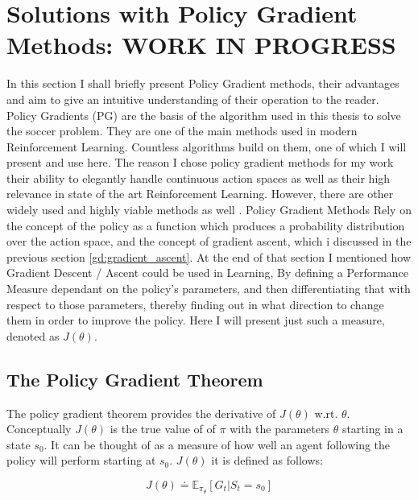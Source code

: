 \newpage
\section{Solutions with Policy Gradient Methods: WORK IN PROGRESS}\label{sec:policy_gradient}
\noindent
In this section I shall briefly present Policy Gradient methods, their advantages and aim to give an intuitive understanding of their operation to the reader. Policy Gradients (PG) are the basis of the algorithm used in this thesis to solve the soccer problem. They are one of the main methods used in modern Reinforcement Learning. Countless algorithms build on them, one of which I will present and use here. The reason I chose policy gradient methods for my work their ability to elegantly handle continuous action spaces as well as their high relevance in state of the art Reinforcement Learning. However, there are other widely used and highly viable methods as well \cite{arulkumaran_brief_2017}. Policy Gradient Methods Rely on the concept of the policy as a function which produces a probability distribution over the action space, and the concept of gradient ascent, which i discussed in the previous section \ref{gd:gradient_ascent}. At the end of that section I mentioned how Gradient Descent / Ascent could be used in Learning, By defining a Performance Measure dependant on the policy's parameters, and then differentiating that with respect to those parameters, thereby finding out in what direction to change them in order to improve the policy. Here I will present just such a measure, denoted as $J(\theta)$. 

\subsection{The Policy Gradient Theorem}\label{subsec:pg:theorem}
The policy gradient theorem provides the derivative of $J(\theta)$ w.rt. $\theta$. Conceptually $J(\theta)$ is the true value of of $\pi$ with the parameters $\theta$ starting in a state $s_0$. It can be thought of as a measure of how well an agent following the policy will perform starting at $s_0$. $J(\theta)$ it is defined as follows:

\begin{equation}\label{pg:performance_measure}
    J(\theta) \doteq \mathbb{E}_{\pi_\theta}[G_t|S_t=s_0]
\end{equation}

